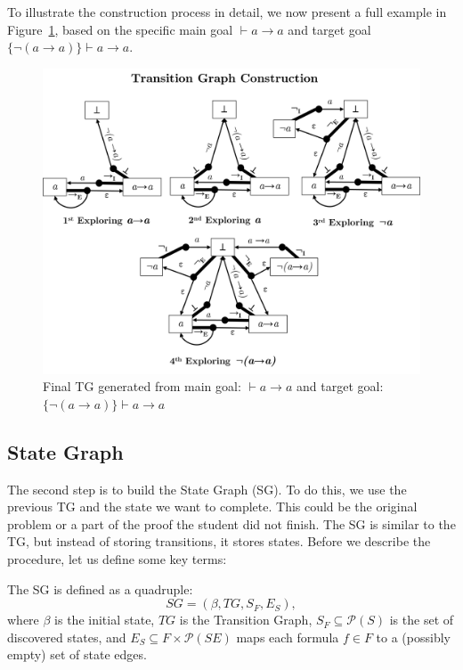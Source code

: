 To illustrate the construction process in detail, we now present a full example in Figure~\ref{fig:tg-final}, based on the specific main goal \(\vdash a \to a\) and target goal \(\{\lnot(a \to a)\} \vdash a \to a\).

\begin{figure}
    \centering
    \includegraphics[width=1\linewidth]{resources/tg-final.png}
    \caption{Final TG generated from main goal: \(\vdash a \to a\) and target goal: \(\{\lnot(a \to a)\} \vdash a \to a\)}
    \label{fig:tg-final}
\end{figure}





\subsection{State Graph}

The second step is to build the State Graph (SG). To do this, we use the previous TG and the state we want to complete. This could be the original problem or a part of the proof the student did not finish. The SG is similar to the TG, but instead of storing transitions, it stores states. Before we describe the procedure, let us define some key terms:

\begin{definition}
The SG is defined as a quadruple:
\[
SG = (\beta, TG, S_F, E_S),
\]
where \( \beta \) is the initial state, \(TG\) is the Transition Graph, \(S_F \subseteq \mathcal{P}(S)\) is the set of discovered states, and \(E_S \subseteq F \times \mathcal{P}(SE)\) maps each formula \( f \in F \) to a (possibly empty) set of state edges.
\end{definition}

